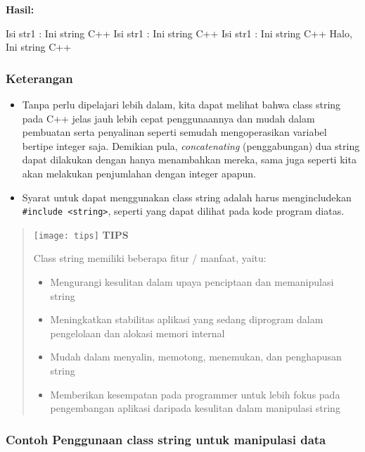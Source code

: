 \textbf{Hasil:}

\begin{lcverbatim}
Isi str1 : Ini string C++
Isi str1 : Ini string C++
Isi str1 : Ini string C++
Halo, Ini string C++
\end{lcverbatim}

\subsubsection*{Keterangan}

\begin{itemize}

\item
  Tanpa perlu dipelajari lebih dalam, kita dapat melihat bahwa class
  string pada C++ jelas jauh lebih cepat penggunaannya dan mudah dalam
  pembuatan serta penyalinan seperti semudah mengoperasikan variabel
  bertipe integer saja. Demikian pula, \emph{concatenating}
  (penggabungan) dua string dapat dilakukan dengan hanya menambahkan
  mereka, sama juga seperti kita akan melakukan penjumlahan dengan
  integer apapun.
\item
  Syarat untuk dapat menggunakan class string adalah harus
  mengincludekan \texttt{\#include\ \textless{}string\textgreater{}},
  seperti yang dapat dilihat pada kode program diatas.
\end{itemize}
\begin{quotation}
\texttt{[image: tips]} \textbf{TIPS} 
 
 Class
 string memiliki beberapa fitur / manfaat, yaitu: 
\begin{itemize}
\item Mengurangi kesulitan dalam upaya penciptaan dan
memanipulasi string
\item Meningkatkan stabilitas aplikasi
yang sedang diprogram dalam pengelolaan dan alokasi memori internal
\item Mudah dalam menyalin, memotong, menemukan, dan
penghapusan string
\item Memberikan kesempatan pada
programmer untuk lebih fokus pada pengembangan aplikasi daripada
kesulitan dalam manipulasi string
\end{itemize} 
 
\end{quotation}


\subsubsection*{Contoh  Penggunaan class string untuk manipulasi data}

